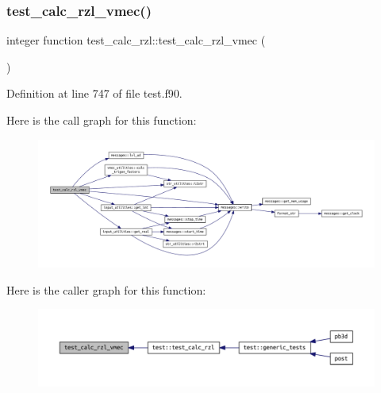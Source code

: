 \subsubsection{\texorpdfstring{test\+\_\+calc\+\_\+rzl\+\_\+vmec()}{test\_calc\_rzl\_vmec()}}
{\footnotesize\ttfamily integer function test\+\_\+calc\+\_\+rzl\+::test\+\_\+calc\+\_\+rzl\+\_\+vmec (\begin{DoxyParamCaption}{ }\end{DoxyParamCaption})}



Definition at line 747 of file test.\+f90.

Here is the call graph for this function\+:
\nopagebreak
\begin{figure}[H]
\begin{center}
\leavevmode
\includegraphics[width=350pt]{test_8f90_aeb10d95d96ba86499fee37a84048e43c_cgraph}
\end{center}
\end{figure}
Here is the caller graph for this function\+:
\nopagebreak
\begin{figure}[H]
\begin{center}
\leavevmode
\includegraphics[width=350pt]{test_8f90_aeb10d95d96ba86499fee37a84048e43c_icgraph}
\end{center}
\end{figure}
